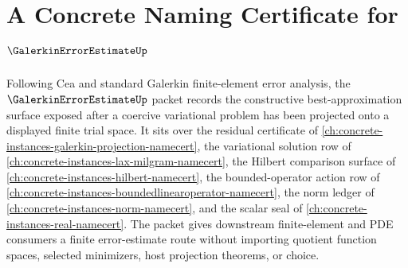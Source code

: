\chapter{A Concrete Naming Certificate for $\GalerkinErrorEstimateUp$}
\label{ch:concrete-instances-galerkin-error-estimate-namecert}

Following Cea and standard Galerkin finite-element error analysis, the $\GalerkinErrorEstimateUp$ packet records the constructive best-approximation surface exposed after a coercive variational problem has been projected onto a displayed finite trial space. It sits over the residual certificate of \autoref{ch:concrete-instances-galerkin-projection-namecert}, the variational solution row of \autoref{ch:concrete-instances-lax-milgram-namecert}, the Hilbert comparison surface of \autoref{ch:concrete-instances-hilbert-namecert}, the bounded-operator action row of \autoref{ch:concrete-instances-boundedlinearoperator-namecert}, the norm ledger of \autoref{ch:concrete-instances-norm-namecert}, and the scalar seal of \autoref{ch:concrete-instances-real-namecert}. The packet gives downstream finite-element and PDE consumers a finite error-estimate route without importing quotient function spaces, selected minimizers, host projection theorems, or choice.


